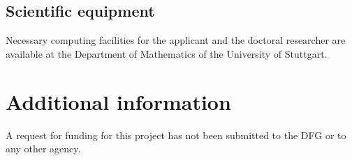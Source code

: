 \documentclass[enabledeprecatedfontcommands,cleardoublepage=empty,headsepline,twoside,11pt,DIV=15,BCOR=12mm,final]{scrartcl}
\begin{document}
\subsection{Scientific equipment}
Necessary computing facilities for the applicant and the doctoral researcher are available at the
Department of Mathematics of the University of Stuttgart.

\section{Additional information}
\label{sec:addit-inform}

A request for funding for this project has not been submitted to the DFG or to any other
agency.
\end{document}
